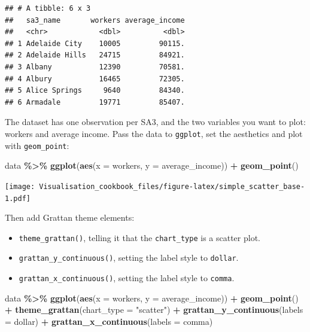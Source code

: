 \documentclass[
]{book}
\newenvironment{Shaded}{\begin{snugshade}}{\end{snugshade}}
\newcommand{\DataTypeTok}[1]{\textcolor[rgb]{0.13,0.29,0.53}{#1}}
\newcommand{\KeywordTok}[1]{\textcolor[rgb]{0.13,0.29,0.53}{\textbf{#1}}}
\newcommand{\NormalTok}[1]{#1}
\newcommand{\OperatorTok}[1]{\textcolor[rgb]{0.81,0.36,0.00}{\textbf{#1}}}
\newcommand{\StringTok}[1]{\textcolor[rgb]{0.31,0.60,0.02}{#1}}
\providecommand{\tightlist}{%
  \setlength{\itemsep}{0pt}\setlength{\parskip}{0pt}}
\begin{document}
\begin{verbatim}
## # A tibble: 6 x 3
##   sa3_name       workers average_income
##   <chr>            <dbl>          <dbl>
## 1 Adelaide City    10005         90115.
## 2 Adelaide Hills   24715         84921.
## 3 Albany           12390         70581.
## 4 Albury           16465         72305.
## 5 Alice Springs     9640         84340.
## 6 Armadale         19771         85407.
\end{verbatim}

The dataset has one observation per SA3, and the two variables you want to plot: workers and average income. Pass the data to \texttt{ggplot}, set the aesthetics and plot with \texttt{geom\_point}:

\begin{Shaded}
\begin{Highlighting}[]
\NormalTok{data }\OperatorTok{\%\textgreater{}\%}\StringTok{ }
\StringTok{  }\KeywordTok{ggplot}\NormalTok{(}\KeywordTok{aes}\NormalTok{(}\DataTypeTok{x =}\NormalTok{ workers,}
             \DataTypeTok{y =}\NormalTok{ average\_income)) }\OperatorTok{+}\StringTok{ }
\StringTok{  }\KeywordTok{geom\_point}\NormalTok{()}
\end{Highlighting}
\end{Shaded}

\texttt{[image: Visualisation\_cookbook\_files/figure-latex/simple\_scatter\_base-1.pdf]}

Then add Grattan theme elements:

\begin{itemize}
\tightlist
\item
  \texttt{theme\_grattan()}, telling it that the \texttt{chart\_type} is a scatter plot.
\item
  \texttt{grattan\_y\_continuous()}, setting the label style to \texttt{dollar}.
\item
  \texttt{grattan\_x\_continuous()}, setting the label style to \texttt{comma}.
\end{itemize}

\begin{Shaded}
\begin{Highlighting}[]
\NormalTok{data }\OperatorTok{\%\textgreater{}\%}\StringTok{ }
\StringTok{  }\KeywordTok{ggplot}\NormalTok{(}\KeywordTok{aes}\NormalTok{(}\DataTypeTok{x =}\NormalTok{ workers,}
             \DataTypeTok{y =}\NormalTok{ average\_income)) }\OperatorTok{+}\StringTok{ }
\StringTok{  }\KeywordTok{geom\_point}\NormalTok{()  }\OperatorTok{+}
\StringTok{  }\KeywordTok{theme\_grattan}\NormalTok{(}\DataTypeTok{chart\_type =} \StringTok{"scatter"}\NormalTok{) }\OperatorTok{+}\StringTok{ }
\StringTok{  }\KeywordTok{grattan\_y\_continuous}\NormalTok{(}\DataTypeTok{labels =}\NormalTok{ dollar) }\OperatorTok{+}\StringTok{ }
\StringTok{  }\KeywordTok{grattan\_x\_continuous}\NormalTok{(}\DataTypeTok{labels =}\NormalTok{ comma)}
\end{Highlighting}
\end{Shaded}
\end{document}
